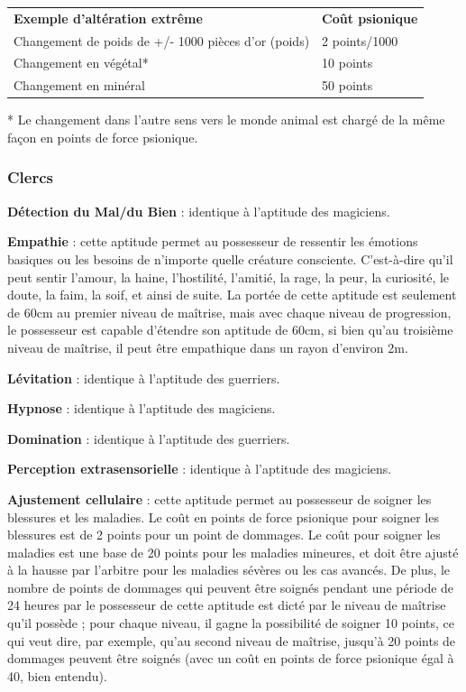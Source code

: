 \documentclass[11pt]{article}
\begin{document}
{\bigskip

\begin{tabular}{p{10cm}l}
\textbf{Exemple d'altération extrême} & \textbf{Coût psionique} \\
Changement de poids de +/- 1000 pièces d'or (poids) & 2 points/1000 \\
Changement en végétal* & 10 points \\
Changement en minéral & 50 points \\
\end{tabular}

\bigskip

* Le changement dans l'autre sens vers le monde animal est chargé de la même façon en points de force psionique.

\subsubsection*{Clercs}

\textbf{Détection du Mal/du Bien} : identique à l'aptitude des magiciens.

\bigskip

\textbf{Empathie} : cette aptitude permet au possesseur de ressentir les émotions basiques ou les besoins de n'importe quelle créature consciente. C'est-à-dire qu'il peut sentir l'amour, la haine, l'hostilité, l'amitié, la rage, la peur, la curiosité, le doute, la faim, la soif, et ainsi de suite. La portée de cette aptitude est seulement de 60cm au premier niveau de maîtrise, mais avec chaque niveau de progression, le possesseur est capable d'étendre son aptitude de 60cm, si bien qu'au troisième niveau de maîtrise, il peut être empathique dans un rayon d'environ 2m.

\bigskip

\textbf{Lévitation} : identique à l'aptitude des guerriers.

\bigskip

\textbf{Hypnose} : identique à l'aptitude des magiciens.

\bigskip

\textbf{Domination} : identique à l'aptitude des guerriers.

\bigskip

\textbf{Perception extrasensorielle} : identique à l'aptitude des magiciens.

\bigskip

\textbf{Ajustement cellulaire} : cette aptitude permet au possesseur de soigner les blessures et les maladies. Le coût en points de force psionique pour soigner les blessures est de 2 points pour un point de dommages. Le coût pour soigner les maladies est une base de 20 points pour les maladies mineures, et doit être ajusté à la hausse par l'arbitre pour les maladies sévères ou les cas avancés. De plus, le nombre de points de dommages qui peuvent être soignés pendant une période de 24 heures par le possesseur de cette aptitude est dicté par le niveau de maîtrise qu'il possède ; pour chaque niveau, il gagne la possibilité de soigner 10 points, ce qui veut dire, par exemple, qu'au second niveau de maîtrise, jusqu'à 20 points de dommages peuvent être soignés (avec un coût en points de force psionique égal à 40, bien entendu).

}
\end{document}
